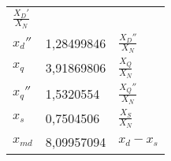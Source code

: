\begin{longtable}[]{@{}lll@{}}
\begin{minipage}[t]{0.55\columnwidth}
\(\frac{X_D'}{X_N}\)\strut
\end{minipage}\tabularnewline
\begin{minipage}[t]{0.10\columnwidth}\raggedright
\(x_d''\)\strut
\end{minipage} & \begin{minipage}[t]{0.25\columnwidth}\raggedright
1,28499846\strut
\end{minipage} & \begin{minipage}[t]{0.55\columnwidth}\raggedright
\(\frac{X_D''}{X_N}\)\strut
\end{minipage}\tabularnewline
\begin{minipage}[t]{0.10\columnwidth}\raggedright
\(x_q\)\strut
\end{minipage} & \begin{minipage}[t]{0.25\columnwidth}\raggedright
3,91869806\strut
\end{minipage} & \begin{minipage}[t]{0.55\columnwidth}\raggedright
\(\frac{X_Q}{X_N}\)\strut
\end{minipage}\tabularnewline
\begin{minipage}[t]{0.10\columnwidth}\raggedright
\(x_q''\)\strut
\end{minipage} & \begin{minipage}[t]{0.25\columnwidth}\raggedright
1,5320554\strut
\end{minipage} & \begin{minipage}[t]{0.55\columnwidth}\raggedright
\(\frac{X_Q''}{X_N}\)\strut
\end{minipage}\tabularnewline
\begin{minipage}[t]{0.10\columnwidth}\raggedright
\(x_s\)\strut
\end{minipage} & \begin{minipage}[t]{0.25\columnwidth}\raggedright
0,7504506\strut
\end{minipage} & \begin{minipage}[t]{0.55\columnwidth}\raggedright
\(\frac{X_S}{X_N}\)\strut
\end{minipage}\tabularnewline
\begin{minipage}[t]{0.10\columnwidth}\raggedright
\(x_{md}\)\strut
\end{minipage} & \begin{minipage}[t]{0.25\columnwidth}\raggedright
8,09957094\strut
\end{minipage} & \begin{minipage}[t]{0.55\columnwidth}\raggedright
\(x_d-x_s\)\strut
\end{minipage}\tabularnewline

\end{longtable}
